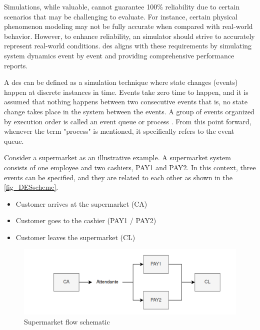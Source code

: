 
Simulations, while valuable, cannot guarantee 100\% reliability due to certain scenarios that may be challenging to evaluate. For instance, 
certain physical phenomenon modeling may not be fully accurate when compared with real-world behavior. However, to enhance reliability, an 
simulator should strive to accurately represent real-world conditions. \gls{des} aligns with these requirements by simulating system dynamics 
event by event and providing comprehensive performance reports.

A \gls{des} can be defined as a simulation technique where state changes (events) happen at discrete instances in time. Events take zero time 
to happen, and it is assumed that nothing happens between two consecutive events that is, no state change takes place in the system between the 
events. A group of events organized by execution order is called an event queue or process \cite{DESVarga} \cite{SimulationBook}. From this point 
forward, whenever the term "process" is mentioned, it specifically refers to the event queue.

Consider a supermarket as an illustrative example. A supermarket system consists of one employee and two cashiers, PAY1 and PAY2. In this context, 
three events can be specified, and they are related to each other as shown in the \autoref{fig_DESscheme}.

\begin{itemize}
    \item Customer arrives at the supermarket (CA)
    \item Customer goes to the cashier (PAY1 / PAY2)
    \item Customer leaves the supermarket (CL)
\end{itemize}

\begin{figure}[H]
	\centering
 	\includegraphics[width=0.9\linewidth]{Images/DES_Scheme.png}
 	\caption{Supermarket flow schematic}
	 \label{fig_DESscheme}
\end{figure}

